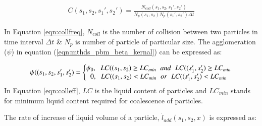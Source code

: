 \documentclass[preprint,11pt,authoryear]{elsarticle}
\begin{document}
\begin{align}
C(s_1,s_2,s_1',s_2')=\frac{N_{coll}(s_1,s_2,s_1',s_2')}{N_p(s_1,s_2)N_p(s_1',s_2')\Delta t}
\label{eqn:collfreq}
\end{align}

In Equation \ref{eqn:collfreq}, $N_{coll}$ is the number of collision between two particles in 
time interval $\Delta t$ \& $N_p$ is number of particle of particular size. The agglomeration 
($\psi$) in equation (\ref{eqn:mthds_pbm_beta_kernal}) can be expressed as:

\begin{align}
\psi((s_1,s_2,s_1',s_2') = 
\left\{\begin{matrix}
\psi_0,\hspace{0.2cm} LC((s_1,s_2) \geq LC_{min}\hspace{0.2cm} and\hspace{0.2cm} LC((s_1',s_2') \geq LC_{min}	\\ 
0,\hspace{0.2cm} LC((s_1,s_2) < LC_{min}\hspace{0.2cm} or\hspace{0.2cm} LC((s_1',s_2') < LC_{min}
\end{matrix}\right.
\label{eqn:colleff}
\end{align}
 In Equation \ref{eqn:colleff}, $LC$ is the liquid content of particles and $LC_{min}$ stands for minimum 
 liquid content required for coalescence of particles. 



%	
%	    
%	    
%	    

The rate of increase of liquid volume of a particle, $\dot{l}_{add}(s_1,s_2,x)$ is expressed as:
\end{document}
